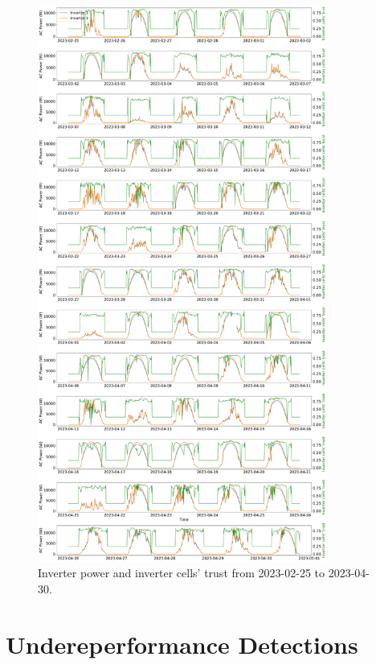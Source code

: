 \begin{figure}[hbtp]
    \centering
    \includegraphics[width=0.85\textwidth]{figures/appendix/c_results/all_power_and_trust_pt2.pdf}
    \caption{Inverter power and inverter cells' trust from 2023-02-25 to 2023-04-30.}
    \label{fig:alltimeseries_pt2}
\end{figure}

\FloatBarrier
\section{Undereperformance Detections} \label{ap3:undereperfdet}

